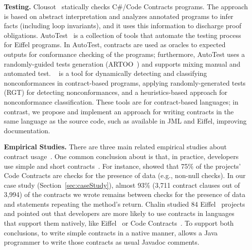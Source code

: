 \textbf{Testing.}
Clousot~\cite{clousot} statically checks C\#/Code
Contracts programs. The approach is based on abstract interpretation and analyzes annotated programs
to infer facts (including loop invariants), and it uses this information to discharge proof
obligations. 
AutoTest~\cite{autotest} is a collection of tools that automate the testing process for
Eiffel programs. In AutoTest, contracts are used as oracles to expected outputs for conformance checking of the programs; furthermore, AutoTest uses a randomly-guided tests generation (ARTOO~\cite{artoo}) and
supports mixing manual and automated test. 
\jmloktool{}~\cite{jmlok2} is a tool for dynamically detecting and classifying nonconformances in contract-based programs, applying randomly-generated tests (RGT) for detecting nonconformances, and a heuristics-based approach for nonconformance classification. 
These tools are for contract-based languages; in contrast, we propose and implement an approach for writing contracts in the same language as the source code, such as available in JML and Eiffel, improving documentation.

\textbf{Empirical Studies.}
There are three main related empirical studies about contract usage~\cite{typeContracts,Estler-etal14,Chalin06}.
One common conclusion about is that, in practice, developers use simple and short
contracts~\cite{typeContracts,Estler-etal14}. For instance,
\cite{typeContracts} showed that 75\% of the projects' Code Contracts are checks for the presence of data (e.g., non-null checks).
In our case study (Section~\ref{sec:caseStudy}), almost 93\% (3,711 contract
clauses out of 3,994) of the contracts we wrote remains between checks for the
presence of data and statements repeating the method's return. Chalin studied 84 Eiffel~\cite{eiffel} projects
and pointed out that developers are more likely to use contracts in languages that support them natively, like Eiffel~\cite{eiffel} or Code Contracts~\cite{codeContractsPaper}.
To support both conclusions, to write simple contracts in a native manner, \contractjdoc{} allows a Java programmer
to write those contracts as usual Javadoc comments.
